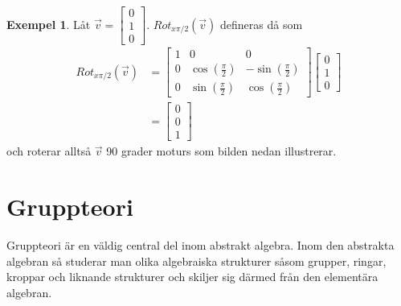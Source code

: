 \documentclass{article}
\theoremstyle{definition}
\newtheorem{exmp}[thm]{Exempel}
\begin{document}
\begin{exmp}
  Låt $\vec{v} = \begin{bmatrix}
    0 \\
    1 \\
    0
  \end{bmatrix}.$
  $Rot_{x \pi/2} (\vec{v})$ defineras då som
  \begin{align*}
    Rot_{x \pi/2} (\vec{v}) &= 
    \begin{bmatrix}
        1 & 0 & 0 \\
        0 & \cos(\frac{\pi}{2}) & -\sin(\frac{\pi}{2}) \\
        0 & \sin(\frac{\pi}{2}) & \cos(\frac{\pi}{2})
    \end{bmatrix}
    \begin{bmatrix}
      0 \\
      1 \\
      0
    \end{bmatrix} \\
    &= \begin{bmatrix}
      0 \\
      0 \\
      1
    \end{bmatrix}
  \end{align*}
  och roterar alltså $\vec{v}$ 90 grader moturs som bilden nedan illustrerar.
  \begin{center}
  \end{center}
\end{exmp}

\section{Gruppteori}
Gruppteori är en väldig central del inom abstrakt algebra. 
Inom den abstrakta algebran så studerar man olika algebraiska strukturer
såsom grupper, ringar, kroppar och liknande strukturer och skiljer sig därmed från den elementära algebran. 
\end{document}
